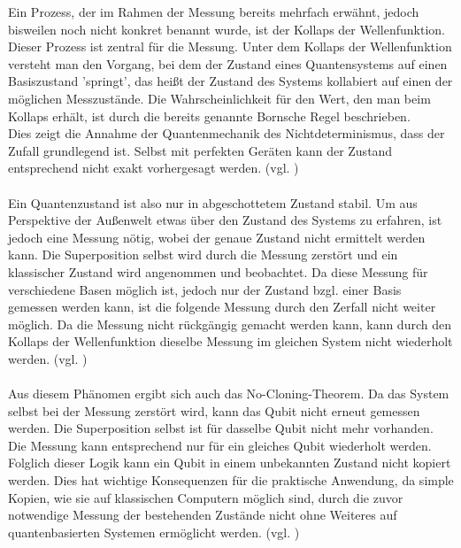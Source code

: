 Ein Prozess, der im Rahmen der Messung bereits mehrfach erwähnt, jedoch bisweilen noch nicht konkret benannt wurde, ist der Kollaps der Wellenfunktion. Dieser Prozess ist zentral für die Messung. 
Unter dem Kollaps der Wellenfunktion versteht man den Vorgang, bei dem der Zustand eines Quantensystems auf einen Basiszustand 'springt', das heißt der Zustand des Systems kollabiert auf einen der möglichen Messzustände. Die Wahrscheinlichkeit für den Wert, den man beim Kollaps erhält, ist durch die bereits genannte Bornsche Regel beschrieben. \\
Dies zeigt die Annahme der Quantenmechanik des Nichtdeterminismus, dass der Zufall grundlegend ist. Selbst mit perfekten Geräten kann der Zustand entsprechend nicht exakt vorhergesagt werden. 
(vgl. \cite[Ch. 1.4.1]{lvovsky_quantum_2018})
\\
\\
Ein Quantenzustand ist also nur in abgeschottetem Zustand stabil. Um aus Perspektive der Außenwelt etwas über den Zustand des Systems zu erfahren, ist jedoch eine Messung nötig, wobei der genaue Zustand nicht ermittelt werden kann.
Die Superposition selbst wird durch die Messung zerstört und ein klassischer Zustand wird angenommen und beobachtet. Da diese Messung für verschiedene Basen möglich ist, jedoch nur der Zustand bzgl. einer Basis gemessen werden kann, ist die folgende Messung durch den Zerfall nicht weiter möglich.
Da die Messung nicht rückgängig gemacht werden kann, kann durch den Kollaps der Wellenfunktion dieselbe Messung im gleichen System nicht wiederholt werden.
(vgl. \cite[Ch. 2.8]{homeister_quantum_2022})
\\
\\
Aus diesem Phänomen ergibt sich auch das No-Cloning-Theorem. Da das System selbst bei der Messung zerstört wird, kann das Qubit nicht erneut gemessen werden. Die Superposition selbst ist für dasselbe Qubit nicht mehr vorhanden. Die Messung kann entsprechend nur für ein gleiches Qubit wiederholt werden.
Folglich dieser Logik kann ein Qubit in einem unbekannten Zustand nicht kopiert werden. Dies hat wichtige Konsequenzen für die praktische Anwendung, da simple Kopien, wie sie auf klassischen Computern möglich sind, durch die zuvor notwendige Messung der bestehenden Zustände nicht ohne Weiteres auf quantenbasierten Systemen ermöglicht werden.
(vgl. \cite[Ch. 4.4]{hughes_quantum_2021})


